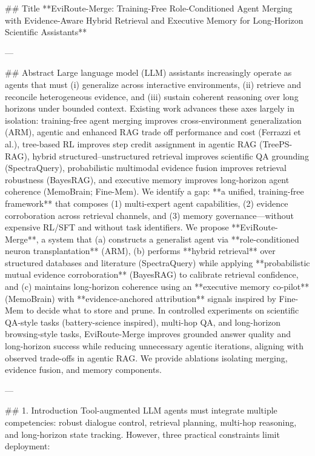 ## Title  
**EviRoute-Merge: Training-Free Role-Conditioned Agent Merging with Evidence-Aware Hybrid Retrieval and Executive Memory for Long-Horizon Scientific Assistants**

---

## Abstract  
Large language model (LLM) assistants increasingly operate as agents that must (i) generalize across interactive environments, (ii) retrieve and reconcile heterogeneous evidence, and (iii) sustain coherent reasoning over long horizons under bounded context. Existing work advances these axes largely in isolation: training-free agent merging improves cross-environment generalization (ARM), agentic and enhanced RAG trade off performance and cost (Ferrazzi et al.), tree-based RL improves step credit assignment in agentic RAG (TreePS-RAG), hybrid structured–unstructured retrieval improves scientific QA grounding (SpectraQuery), probabilistic multimodal evidence fusion improves retrieval robustness (BayesRAG), and executive memory improves long-horizon agent coherence (MemoBrain; Fine-Mem). We identify a gap: **a unified, training-free framework** that composes (1) multi-expert agent capabilities, (2) evidence corroboration across retrieval channels, and (3) memory governance—without expensive RL/SFT and without task identifiers.  
We propose **EviRoute-Merge**, a system that (a) constructs a generalist agent via **role-conditioned neuron transplantation** (ARM), (b) performs **hybrid retrieval** over structured databases and literature (SpectraQuery) while applying **probabilistic mutual evidence corroboration** (BayesRAG) to calibrate retrieval confidence, and (c) maintains long-horizon coherence using an **executive memory co-pilot** (MemoBrain) with **evidence-anchored attribution** signals inspired by Fine-Mem to decide what to store and prune. In controlled experiments on scientific QA-style tasks (battery-science inspired), multi-hop QA, and long-horizon browsing-style tasks, EviRoute-Merge improves grounded answer quality and long-horizon success while reducing unnecessary agentic iterations, aligning with observed trade-offs in agentic RAG. We provide ablations isolating merging, evidence fusion, and memory components.

---

## 1. Introduction  
Tool-augmented LLM agents must integrate multiple competencies: robust dialogue control, retrieval planning, multi-hop reasoning, and long-horizon state tracking. However, three practical constraints limit deployment:

